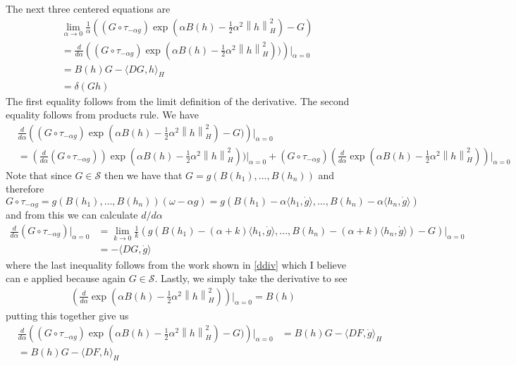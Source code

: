\documentclass[a4paper,11pt]{article}
\numberwithin{equation}{section}
\theoremstyle{plain}
\theoremstyle{definition}
\newcommand{\Norm}[1]{\left\|  #1   \right\|}
\numberwithin{NQ}{section}
\numberwithin{LQ}{section}
\numberwithin{ZQ}{section}
\begin{document}
The next three centered equations are 
\begin{align}
&\lim_{\alpha \to 0} \frac{1}{\alpha}\left((G\circ \tau_{-\alpha g})\exp(\alpha B(h)-\frac{1}{2}\alpha^2 \Norm{h}_H^2)-G\right) \nonumber
\\&= \frac{d}{d\alpha} \left( (G\circ \tau_{-\alpha g})\exp(\alpha B(h)-\frac{1}{2}\alpha^2 \Norm{h}_H^2)) \right) \bigg\vert_{\alpha = 0}
\\&= B(h)G - \langle DG,h \rangle_H 
\\&= \delta(Gh)
\end{align}
The first equality follows from the limit definition of the derivative. The second equality follows from products rule. We have 
\begin{align*}
	 &\frac{d}{d\alpha} \left( (G\circ \tau_{-\alpha g})\exp(\alpha B(h)-\frac{1}{2}\alpha^2 \Norm{h}_H^2)-G) \right) \bigg\vert_{\alpha = 0}
	 \\&= \left( \frac{d}{d\alpha}  (G\circ \tau_{-\alpha g})\right)\exp(\alpha B(h)-\frac{1}{2}\alpha^2 \Norm{h}_H^2)) \bigg\vert_{\alpha = 0} +  (G\circ \tau_{-\alpha g})\left(  \frac{d}{d\alpha}  \exp(\alpha B(h)-\frac{1}{2}\alpha^2 \Norm{h}_H^2)\right) \bigg\vert_{\alpha = 0}
\end{align*}
Note that since $G \in \mathcal S$ then we have that $G=g(B(h_1),...,B(h_n))$ and therefore 
\[
G\circ \tau_{-\alpha g} = g(B(h_1),...,B(h_n))(\omega - \alpha g) = g(B(h_1)-\alpha \langle h_1, \dot{g} \rangle,...,B(h_n)-\alpha \langle h_n, \dot{g}\rangle)
\]
and from this we can calculate $d/d\alpha$
\begin{align*}
	  \frac{d}{d\alpha}  (G\circ \tau_{-\alpha g}) \bigg \vert_{\alpha = 0} &= \lim_{k \to 0} \frac{1}{k}\left(g(B(h_1)-(\alpha +k) \langle h_1, \dot{g} \rangle,...,B(h_n)-(\alpha+k) \langle h_n, \dot{g}\rangle) -G\right)  \bigg \vert_{\alpha = 0}
	  \\&= -\langle DG, \dot{g} \rangle 
\end{align*}
where the last inequality follows from the work shown in \eqref{ddiv} which I believe can e applied because again $G \in \mathcal S$. Lastly, we simply take the derivative to see
\begin{align*}
	\left(  \frac{d}{d\alpha}  \exp(\alpha B(h)-\frac{1}{2}\alpha^2 \Norm{h}_H^2)\right) \bigg\vert_{\alpha = 0} = B(h)
\end{align*}
putting this together give us 
\begin{align*}
		 &\frac{d}{d\alpha} \left( (G\circ \tau_{-\alpha g})\exp(\alpha B(h)-\frac{1}{2}\alpha^2 \Norm{h}_H^2)-G) \right) \bigg\vert_{\alpha = 0} &= B(h)G - \langle DF, \dot{g} \rangle_H
		 \\& = B(h)G - \langle DF, h \rangle_H
\end{align*} 
\end{document}
